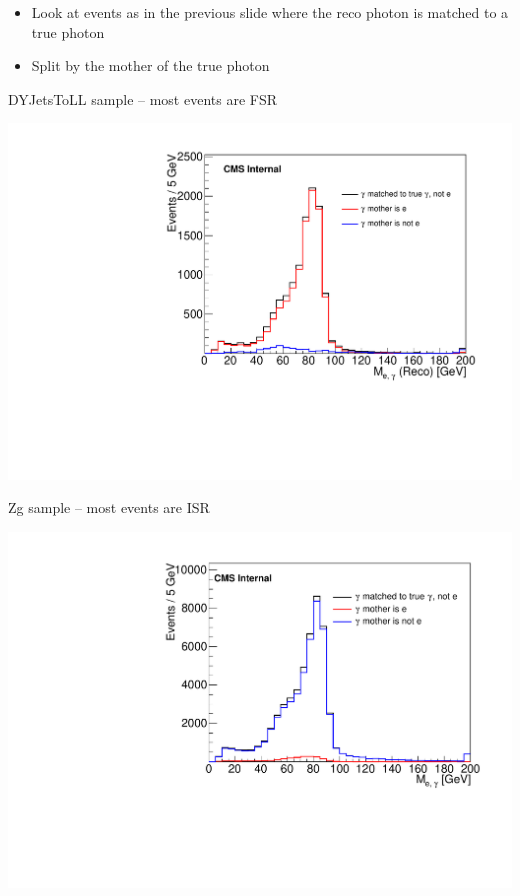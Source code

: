 \documentclass{beamer}
\begin{document}
 {

    \begin{itemize}
        \item Look at events as in the previous slide where the reco photon is matched to a true photon
        \item Split by the mother of the true photon
    \end{itemize}

    \bc

        \scriptsize

        DYJetsToLL sample -- most events are FSR

        \includegraphics[width=\textwidth]{Plots/DYJetsToLL_1el1ph_truthCompRealPhotonsMatching.pdf}


        \scriptsize

        Zg sample -- most events are ISR

        \includegraphics[width=\textwidth]{Plots/DYJetsToLL_1el1ph_truthCompRealPhotonsMatchingZg.pdf}

    \ec

}
\end{document}
